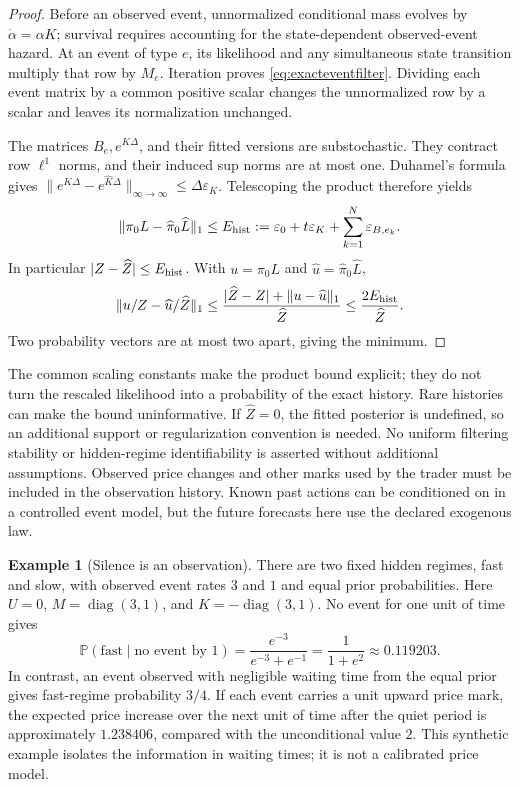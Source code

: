 \documentclass[11pt]{article}
\theoremstyle{plain}
\theoremstyle{definition}
\newtheorem{example}[theorem]{Example}
\theoremstyle{remark}
\newcommand{\norm}[1]{\lVert#1\rVert}
\begin{document}
\begin{proof}
Before an observed event, unnormalized conditional mass evolves by
\(\dot\alpha=\alpha K\); survival requires accounting for the
state-dependent observed-event hazard. At an event of type \(e\),
its likelihood and any simultaneous state transition multiply that
row by \(M_e\). Iteration proves \eqref{eq:exacteventfilter}.
Dividing each event matrix by a common positive scalar changes the
unnormalized row by a scalar and leaves its normalization unchanged.

The matrices \(B_e,e^{K\Delta}\), and their fitted versions are
substochastic. They contract row \(\ell^1\) norms, and their induced
sup norms are at most one. Duhamel's formula gives
\(\norm{e^{K\Delta}-e^{\widehat K\Delta}}_{\infty\to\infty}
\le\Delta\varepsilon_K\). Telescoping the product therefore yields
\[
 \norm{\pi_0L-\widehat\pi_0\widehat L}_1
 \le E_{\rm hist}:=\varepsilon_0+t\varepsilon_K+
                      \sum_{k=1}^N\varepsilon_{B,e_k}.
\]
In particular \(|Z-\widehat Z|\le E_{\rm hist}\). With
\(u=\pi_0L\) and \(\widehat u=\widehat\pi_0\widehat L\),
\[
 \norm{u/Z-\widehat u/\widehat Z}_1
 \le\frac{|\widehat Z-Z|+\norm{u-\widehat u}_1}{\widehat Z}
 \le\frac{2E_{\rm hist}}{\widehat Z}.
\]
Two probability vectors are at most two apart, giving the minimum.
\end{proof}

The common scaling constants make the product bound explicit; they
do not turn the rescaled likelihood into a probability of the exact
history. Rare histories can make the bound uninformative. If
\(\widehat Z=0\), the fitted posterior is undefined, so an additional
support or regularization convention is needed. No uniform filtering
stability or hidden-regime identifiability is asserted without
additional assumptions. Observed price changes and other marks used
by the trader must be included in the observation history. Known past
actions can be conditioned on in a controlled event model, but the
future forecasts here use the declared exogenous law.

\begin{example}[Silence is an observation]\label{ex:silence}
There are two fixed hidden regimes, fast and slow, with observed
event rates \(3\) and \(1\) and equal prior probabilities. Here
\(U=0\), \(M=\operatorname{diag}(3,1)\), and
\(K=-\operatorname{diag}(3,1)\). No event for one unit of time gives
\[
 \mathbb P(\text{fast}\mid\text{no event by }1)
 =\frac{e^{-3}}{e^{-3}+e^{-1}}
 =\frac1{1+e^2}\approx0.119203.
\]
In contrast, an event observed with negligible waiting time from the
equal prior gives fast-regime probability \(3/4\). If each event
carries a unit upward price mark, the expected price increase over
the next unit of time after the quiet period is approximately
\(1.238406\), compared with the unconditional value \(2\).
This synthetic example isolates the information in waiting times;
it is not a calibrated price model.
\end{example}
\end{document}
